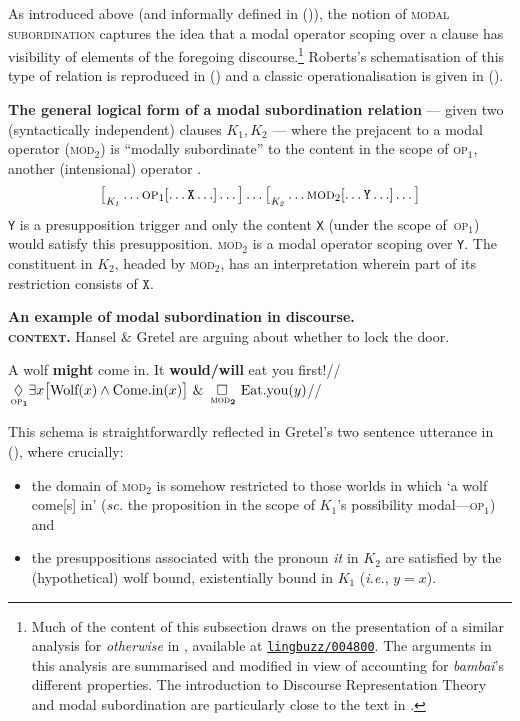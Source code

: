 As introduced above (and informally defined in (\lastx)), the notion of \textsc{modal subordination} captures the idea that a modal operator scoping over a clause has visibility of elements of the foregoing discourse.\footnote{Much of the content of this subsection draws on the presentation of a similar analysis for \textit{otherwise} in \citealt{PhilKotek}, available at \href{https://ling.auf.net/lingbuzz/004800}{\texttt{lingbuzz/004800}}. The arguments in this analysis are summarised and modified in view of accounting for \textit{bambai}'s different properties. The introduction to Discourse Representation Theory and modal subordination are particularly close to the text in \citeyear[§4]{PhilKotek}.} Roberts's schematisation of this type of relation is reproduced in () and a classic operationalisation is given in ().

\pex[labeltype=numeric,everylabel=\small] \textbf{The general logical form of a modal subordination relation} --- given two (syntactically independent) clauses $ \mathit{K_1,K_2} $ --- where the prejacent to a modal operator (\textsc{mod}$ _2 $) is ``modally subordinate'' to the content in the scope of \textsc{op}$ _1 $, another (intensional) operator \citep{Roberts2020}.
 $$ \big[_{\mathit{K_1}}\hdots \textsc{op}_1[\hdots \mathtt{X}\hdots]\hdots\big]\hdots\big[_{\mathit{K_2}}\hdots\textsc{mod}_2[\hdots\mathtt{Y}\hdots]\hdots\big] $$
\a\texttt{Y} is a presupposition trigger and only the content \texttt{X} (under the scope of~\textsc{op}$ _1 $) would satisfy this presupposition.
\a \textsc{mod}$ _{2} $ is a modal operator scoping over \texttt{Y}.
\a The constituent in $\mathit{K_2} $, headed by \textsc{mod}$ _2 $, has an interpretation wherein part of its restriction consists of $ \mathtt{X} $.
\xe


\pex[everylabel=\bf\sc]\textbf{ An example of modal subordination in discourse.}\\
\textbf{\textsc{context.}} Hansel \& Gretel are arguing about whether to lock the door.

\a[label=g] \begingl\gla A wolf \textbf{might} come in. It \textbf{would/will} eat you first!//
\glft $ \boldsymbol{\underset{\,\textsc{op}_1}{\lozenge}}\exists x\big[\text{Wolf}(x)\wedge\text{Come.in}(x)\big]\ \&\ \boldsymbol{\underset{\,\textsc{mod}_2}{\square}}\ \text{Eat.you}(y) $//\endgl
\xe


\noindent This schema is straightforwardly reflected in Gretel's two sentence utterance in (), where crucially:\begin{itemize} \item the domain of \textsc{mod}$ _2 $ is somehow restricted to those worlds in which `a wolf come[s] in' (\textit{sc.} the proposition in the scope of $ \mathit{K_1} $'s possibility modal---\textsc{op}$ _{1} $) and \item the presuppositions associated with the pronoun \textit{it} in $ \mathit{K_2} $ are satisfied by the (hypothetical) wolf bound, existentially bound in $ \mathit{K_1} $ (\textit{i.e.}, $ y=x $).\end{itemize}

